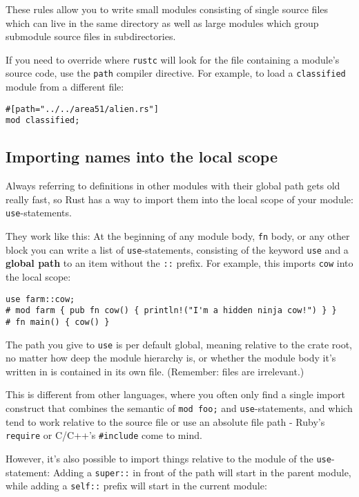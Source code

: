 \documentclass[]{article}
\begin{document}
These rules allow you to write small modules consisting of single source
files which can live in the same directory as well as large modules
which group submodule source files in subdirectories.

If you need to override where \texttt{rustc} will look for the file
containing a module's source code, use the \texttt{path} compiler
directive. For example, to load a \texttt{classified} module from a
different file:

\begin{verbatim}
#[path="../../area51/alien.rs"]
mod classified;
\end{verbatim}

\subsection{Importing names into the local
scope}\label{importing-names-into-the-local-scope}

Always referring to definitions in other modules with their global path
gets old really fast, so Rust has a way to import them into the local
scope of your module: \texttt{use}-statements.

They work like this: At the beginning of any module body, \texttt{fn}
body, or any other block you can write a list of
\texttt{use}-statements, consisting of the keyword \texttt{use} and a
\textbf{global path} to an item without the \texttt{::} prefix. For
example, this imports \texttt{cow} into the local scope:

\begin{verbatim}
use farm::cow;
# mod farm { pub fn cow() { println!("I'm a hidden ninja cow!") } }
# fn main() { cow() }
\end{verbatim}

The path you give to \texttt{use} is per default global, meaning
relative to the crate root, no matter how deep the module hierarchy is,
or whether the module body it's written in is contained in its own file.
(Remember: files are irrelevant.)

This is different from other languages, where you often only find a
single import construct that combines the semantic of \texttt{mod foo;}
and \texttt{use}-statements, and which tend to work relative to the
source file or use an absolute file path - Ruby's \texttt{require} or
C/C++'s \texttt{\#include} come to mind.

However, it's also possible to import things relative to the module of
the \texttt{use}-statement: Adding a \texttt{super::} in front of the
path will start in the parent module, while adding a \texttt{self::}
prefix will start in the current module:
\end{document}
